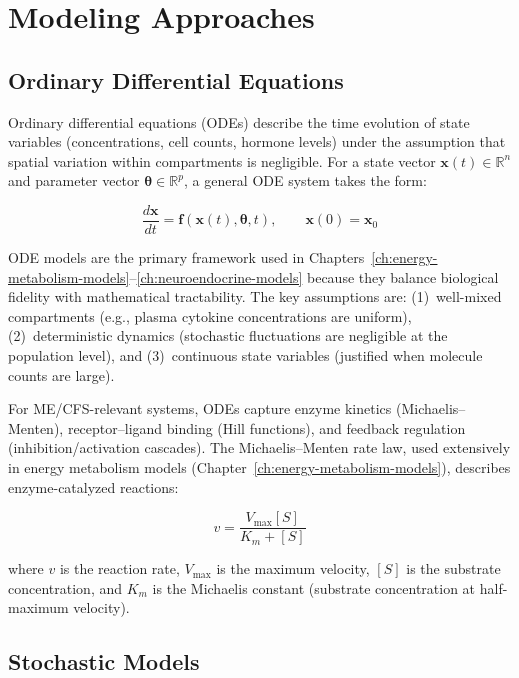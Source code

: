 \section{Modeling Approaches}
\label{sec:modeling-approaches}

\subsection{Ordinary Differential Equations}
\label{sec:ode-models}

Ordinary differential equations (ODEs) describe the time evolution of state variables (concentrations, cell counts, hormone levels) under the assumption that spatial variation within compartments is negligible. For a state vector $\mathbf{x}(t) \in \mathbb{R}^n$ and parameter vector $\boldsymbol{\theta} \in \mathbb{R}^p$, a general ODE system takes the form:

\begin{equation}
\label{eq:general-ode}
\frac{d\mathbf{x}}{dt} = \mathbf{f}(\mathbf{x}(t), \boldsymbol{\theta}, t), \qquad \mathbf{x}(0) = \mathbf{x}_0
\end{equation}

ODE models are the primary framework used in Chapters~\ref{ch:energy-metabolism-models}--\ref{ch:neuroendocrine-models} because they balance biological fidelity with mathematical tractability. The key assumptions are: (1)~well-mixed compartments (e.g., plasma cytokine concentrations are uniform), (2)~deterministic dynamics (stochastic fluctuations are negligible at the population level), and (3)~continuous state variables (justified when molecule counts are large).

For ME/CFS-relevant systems, ODEs capture enzyme kinetics (Michaelis--Menten), receptor--ligand binding (Hill functions), and feedback regulation (inhibition/activation cascades). The Michaelis--Menten rate law, used extensively in energy metabolism models (Chapter~\ref{ch:energy-metabolism-models}), describes enzyme-catalyzed reactions:

\begin{equation}
\label{eq:michaelis-menten}
v = \frac{V_{\max} [S]}{K_m + [S]}
\end{equation}

where $v$ is the reaction rate, $V_{\max}$ is the maximum velocity, $[S]$ is the substrate concentration, and $K_m$ is the Michaelis constant (substrate concentration at half-maximum velocity).

\subsection{Stochastic Models}

